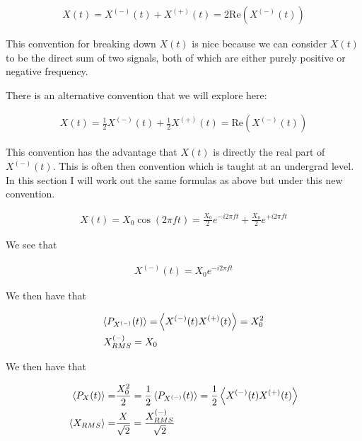 \documentclass[12pt]{article}
\begin{document}
\begin{align}
X(t) = X^{(-)}(t) + X^{(+)}(t) = 2\text{Re}\left(X^{(-)}(t)\right)
\end{align}

This convention for breaking down $X(t)$ is nice because we can consider $X(t)$ to be the direct sum of two signals, both of which are either purely positive or negative frequency.

There is an alternative convention that we will explore here:

\begin{align}
X(t) = \frac{1}{2} X^{(-)}(t) + \frac{1}{2}X^{(+)}(t) = \text{Re}\left(X^{(-)}(t)\right)
\end{align}

This convention has the advantage that $X(t)$ is directly the real part of $X^{(-)}(t)$.
This is often then convention which is taught at an undergrad level. 
In this section I will work out the same formulas as above but under this new convention.

\begin{align}
X(t) = X_0 \cos(2\pi f t) = \frac{X_0}{2} e^{-i 2\pi ft} + \frac{X_0}{2} e^{+i2\pi ft}
\end{align}

We see that 

\begin{align}
X^{(-)}(t) = X_0 e^{-i2\pi ft}
\end{align}

We then have that

\begin{align}
\Braket{P_{X^{(-)}}(t)} =& \Braket{X^{(-)}(t)X^{(+)}(t)} = X_0^2\\
X^{(-)}_{RMS} = X_0
\end{align}

We then have that

\begin{align}
\Braket{P_X(t)} =& \frac{X_0^2}{2} = \frac{1}{2}\Braket{P_{X^{(-)}}(t)} = \frac{1}{2} \Braket{X^{(-)}(t)X^{(+)}(t)}\\
\Braket{X_{RMS}} =& \frac{X}{\sqrt{2}} = \frac{X^{(-)}_{RMS}}{\sqrt{2}}
\end{align}
\end{document}
